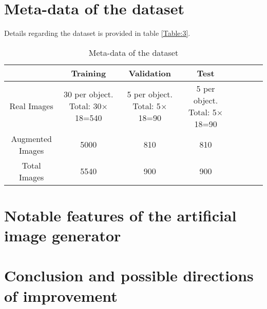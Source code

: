 \documentclass[paper=a4,11pt,parskip=half,toc=listof]{scrartcl}
\begin{document}
	
\section{Meta-data of the dataset}

Details regarding the dataset is provided in table \ref{Table:3}.

\begin{table}[!htb]
\centering
\begin{tabular}{|c|c|c|c|c|c|c|c|}
\hline 
    & Training & Validation & Test \\ 
\hline 
Real Images & \makecell{30 per object.\\ Total: 30$\times$18=540} & \makecell{5 per object.\\ Total: 5$\times$18=90} & \makecell{5 per object.\\ Total: 5$\times$18=90} \\ 
\hline 
Augmented Images & 5000 & 810 & 810 \\ 
\hline 
Total Images & 5540 & 900 & 900 \\ 
\hline 
\end{tabular}
\caption{Meta-data of the dataset} 
\label{Table:4}
\end{table}

\section{Notable features of the artificial image generator}

\section{Conclusion and possible directions of improvement}
\end{document}
